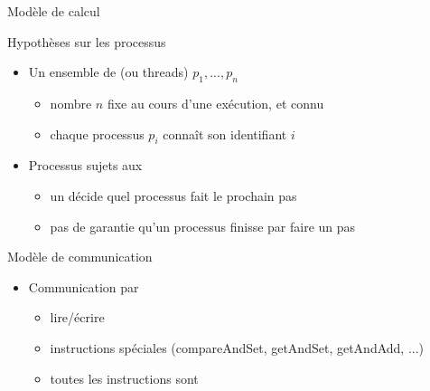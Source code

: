 
\begingroup

\begin{frame}[fragile]{Modèle de calcul}

  \begin{block}{Hypothèses sur les processus}
    \begin{itemize}
    \item Un ensemble de  (ou threads) $p_1, ..., p_n$
      \begin{itemize}
      \item nombre $n$ fixe au cours d'une exécution, et connu
      \item chaque processus $p_i$ connaît son identifiant $i$
      \end{itemize}
    \item Processus  sujets aux 
      \begin{itemize}
      \item un  décide quel processus fait le prochain pas
      \item pas de garantie qu'un processus finisse par faire un pas 
      \end{itemize}
    \end{itemize}
  \end{block}

  \begin{block}{Modèle de communication}
    \begin{itemize}
    \item Communication par 
      \begin{itemize}
      \item lire/écrire
      \item instructions spéciales (compareAndSet, getAndSet, getAndAdd, ...)
      \item toutes les instructions sont 
      \end{itemize}
    \end{itemize}
  \end{block}

\end{frame}

\endgroup
\endinput
